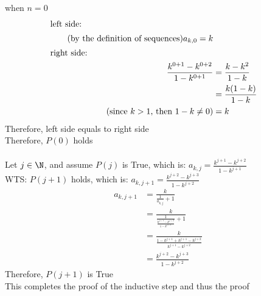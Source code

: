 \documentclass[12pt]{article}
\begin{document}
\base\quad when $n = 0$
\begin{align*}
    \intertext{left side:}
    \tag{by the definition of sequences}
    a_{k,0} = k\\
    \intertext{right side:}
    \frac{k^{0 + 1} - k^{0 + 2}}{1 - k^{0 + 1}} &= \frac{k - k^2}{1 - k}\\
    &= \frac{k(1-k)}{1-k}\\
    \tag{since $k > 1$, then $1-k \neq 0$}
    &= k
\end{align*}
Therefore, left side equals to right side\\
Therefore, $P(0)$ holds\\
\\
\istep\quad Let $j \in \N$, and assume $P(j)$ is True, which is: $a_{k,j} = \frac{k^{j + 1} - k^{j + 2}}{1 - k^{j + 1}}$\\
WTS: $P(j + 1)$ holds, which is: $a_{k,j+1} = \frac{k^{j + 2}- k^{j + 3}}{1 - k^{j + 2}}$
\begin{align*}
    \tag{by the definition of sequences}
    a_{k,j+1} &= \frac{k}{\frac{1}{a_{k,j}} + 1}\\
    \tag{by induction hypothesis}
    &= \frac{k}{\frac{1}{\frac{k^{j+1} - k^{j+2}}{1-k^{j+1}}} + 1}\\
    &= \frac{k}{\frac{1 - k^{j+1}+k^{j+1}-k^{j+2}}{k^{j+1} - k^{j+2}}}\\
    &= \frac{k^{j+2}-k^{j+3}}{1 - k^{j+2}}
\end{align*}
Therefore, $P(j+1)$ is True\\
This completes the proof of the inductive step and thus the proof
\end{document}
